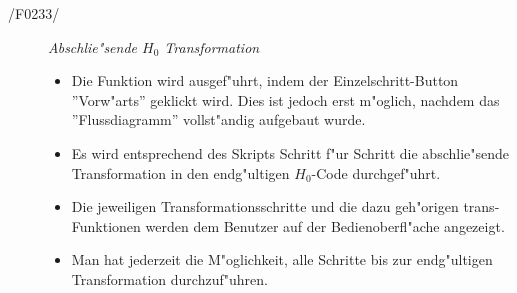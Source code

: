 \begin{description}
\begin{description}
	      \item[/F0233/]
        \textit{Abschlie"sende $H_0$ Transformation}
	      \begin{itemize}
	        \item Die Funktion wird ausgef"uhrt, indem der Einzelschritt-Button
          ''Vorw"arts'' geklickt wird. Dies ist jedoch erst m"oglich, nachdem
          das ''Flussdiagramm'' vollst"andig aufgebaut wurde.
          \item Es wird entsprechend des Skripts Schritt f"ur Schritt die
          abschlie"sende Transformation in den endg"ultigen $H_0$-Code
          durchgef"uhrt.
          \item Die jeweiligen Transformationsschritte und die dazu geh"origen trans-Funktionen werden dem Benutzer auf
          der Bedienoberfl"ache angezeigt.
          \item Man hat jederzeit die M"oglichkeit, alle Schritte bis zur
          endg"ultigen Transformation durchzuf"uhren.
	      \end{itemize}
      \end{description}
 \end{description}
    

